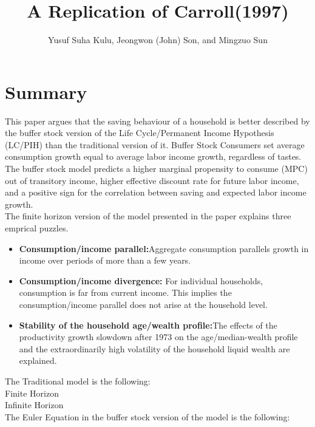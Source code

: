 \documentclass[]{article}
\title{A Replication of Carroll(1997)}
\author{Yusuf Suha Kulu, Jeongwon (John) Son, and Mingzuo Sun}
\date{}
\providecommand{\EqDir}{Equations}
\begin{document}
\linespread{2}
\maketitle

\section{Summary}

This paper argues that the saving behaviour of a household is better described by the buffer stock version of the Life Cycle/Permanent Income Hypothesis (LC/PIH) than the traditional version of it. Buffer Stock Consumers set average consumption growth equal to average labor income growth, regardless of tastes. The buffer stock model predicts a higher marginal propensity to consume (MPC) out of transitory income, higher effective discount rate for future labor income, and a positive sign for the correlation between saving and expected labor income growth.\\

The finite horizon version of the model presented in the paper explains three emprical puzzles.
\begin{itemize}
\item \textbf{Consumption/income parallel:}Aggregate consumption parallels growth in income over periods of more than a few years.
\item \textbf{Consumption/income divergence:} For individual households, consumption is far from current income. This implies the consumption/income parallel does not arise at the household level.
\item \textbf{Stability of the household age/wealth profile:}The effects of the productivity growth slowdown after 1973 on the age/median-wealth profile and the extraordinarily high volatility of the household liquid wealth are explained. 
\end{itemize}

\newpage 

The Traditional model is the following:\\
Finite Horizon \\

Infinite Horizon \\

The Euler Equation in the buffer stock version of the model is the following:\\



\newpage
\end{document}
